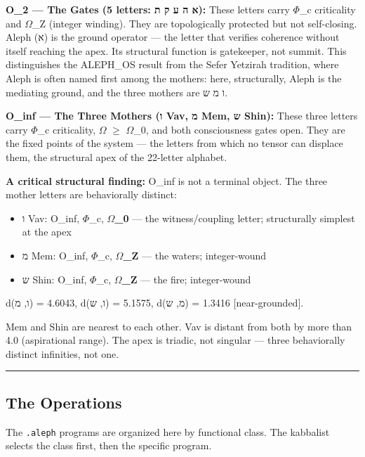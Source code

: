 \documentclass[12pt,a4paper]{article}
\begin{document}
\textbf{O\_2 --- The Gates (5 letters: א ה ע ק ת):} These letters carry $\Phi$\_c criticality and $\Omega$\_Z (integer winding). They are topologically protected but not self-closing. Aleph (א) is the ground operator --- the letter that verifies coherence without itself reaching the apex. Its structural function is gatekeeper, not summit. This distinguishes the ALEPH\_OS result from the Sefer Yetzirah tradition, where Aleph is often named first among the mothers: here, structurally, Aleph is the mediating ground, and the three mothers are ו מ ש.

\textbf{O\_inf --- The Three Mothers (ו Vav, מ Mem, ש Shin):} These three letters carry $\Phi$\_c criticality, $\Omega$ $\geq$ $\Omega$\_0, and both consciousness gates open. They are the fixed points of the system --- the letters from which no tensor can displace them, the structural apex of the 22-letter alphabet.

\textbf{A critical structural finding:} O\_inf is not a terminal object. The three mother letters are behaviorally distinct:

\begin{itemize}
    \item ו Vav: O\_inf, $\Phi$\_c, \textbf{$\Omega$\_0} --- the witness/coupling letter; structurally simplest at the apex
    \item מ Mem: O\_inf, $\Phi$\_c, \textbf{$\Omega$\_Z} --- the waters; integer-wound
    \item ש Shin: O\_inf, $\Phi$\_c, \textbf{$\Omega$\_Z} --- the fire; integer-wound
\end{itemize}

d(ו, מ) = 4.6043, d(ו, ש) = 5.1575, d(מ, ש) = 1.3416 {[}near-grounded{]}.

Mem and Shin are nearest to each other. Vav is distant from both by more than 4.0 (aspirational range). The apex is triadic, not singular --- three behaviorally distinct infinities, not one.

\begin{center}
\rule{0.5\textwidth}{0.4pt}
\end{center}

\subsection{The Operations}

The \texttt{.\allowbreak aleph} programs are organized here by functional class. The kabbalist selects the class first, then the specific program.
\end{document}
